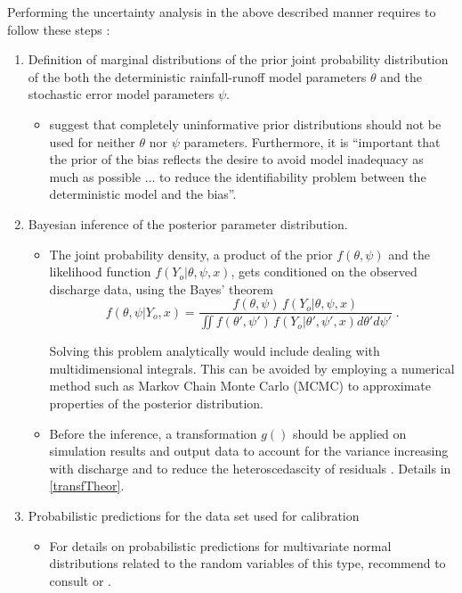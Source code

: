 \documentclass{ctuthesis}\usepackage[]{graphicx}\usepackage[]{color}
\begin{document}
Performing the uncertainty analysis in the above described manner requires to follow these steps \citep{giudice2013improving}:
\begin{enumerate}
	\item  Definition of marginal distributions of the prior joint probability distribution of the both the deterministic rainfall-runoff model parameters $\theta$  and  the stochastic error model parameters $\psi$.
        \begin{itemize}
                \item \cite{giudice2013improving} suggest that completely uninformative prior distributions should not be used for neither $\theta$ nor $\psi$ parameters. Furthermore, it is \enquote{important that the prior of the bias reflects the desire to avoid model inadequacy as much as possible ... to reduce the identifiability problem between the deterministic
model and the bias}.
        \end{itemize}

	\item  Bayesian inference of the posterior parameter distribution.
	\begin{itemize}
                \item	The joint probability density, a product of the prior $f(\theta, \psi)$ and the likelihood function $f(Y_o | \theta, \psi, x)$, gets conditioned on the observed discharge data, using the Bayes' theorem
                \begin{equation}
f (\theta, \psi | Y_o, x) = \frac{ f(\theta, \psi) \, f(Y_o | \theta, \psi, x) } { \iint f(\theta' , \psi') \, f(Y_o | \theta', \psi', x) d\theta' d\psi'} \; .
                \end{equation}

Solving this problem analytically would include dealing with multidimensional integrals. This can be avoided by employing a numerical method such as Markov Chain Monte Carlo (MCMC) to approximate properties of the posterior distribution.

        \item Before the inference, a transformation $g()$  should be applied on simulation results and output data to account for the variance increasing with discharge and to reduce the heteroscedascity of residuals \citep{giudice2013improving}. Details in \ref{transfTheor}.
        \end{itemize}
        
	\item  Probabilistic predictions for the data set used for calibration
	\begin{itemize}
                \item For details on probabilistic predictions for multivariate normal distributions related to the random variables of this type, \cite{giudice2013improving} recommend to consult \cite{kendall1994vol} or \cite{kollo2006advanced}.
        \end{itemize}
	

\end{enumerate}
\end{document}
